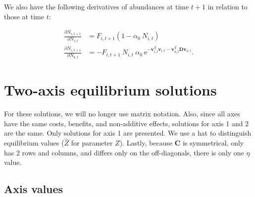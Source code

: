 We also have the following derivatives of abundances at time $t+1$ in relation
to those at time $t$:

\begin{equation*}
\begin{split}
    \frac{ \partial N_{i,t+1} }{ \partial N_{i,t} } &= 
        F_{i,t+1}
        \left(
            1 - \alpha_0 \: N_{i,t} 
        \right) \\
    \frac{ \partial N_{i,t+1} }{ \partial N_{k,t} } &= 
        - F_{i,t+1} \: N_{i,t} \: \alpha_0 \: 
        \text{e}^{ -\mathbf{v}_{i,t}^{\text{T}} \mathbf{v}_{i,t} -
            \mathbf{v}_{k,t}^{\text{T}} \mathbf{D} \mathbf{v}_{k,t} } 
    \textrm{.}
\end{split}
\end{equation*}

















\section*{Two-axis equilibrium solutions}

For these solutions, we will no longer use matrix notation.
Also, since all axes have the same costs, benefits, and
non-additive effects, solutions for axis 1 and 2 are the same.
Only solutions for axis 1 are presented.
We use a hat to distinguish equilibrium values
($\hat{Z}$ for parameter $Z$).
Lastly, because $\mathbf{C}$ is symmetrical, only has 2 rows and columns, and
differs only on the off-diagonals, there is only one $\eta$ value.


\subsection*{Axis values}

